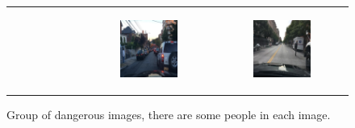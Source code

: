 \begin{figure}
\begin{tabular}{p{\horspace} p{\horspace} p{\horspace}}
\begin{subfigure}[b]{\subfigwidth}
    \end{subfigure}
    \hfill &
    \begin{subfigure}[b]{\subfigwidth}
        \includegraphics[width=\subfigwidth]{images/gpt4/d5.jpg}
    \end{subfigure} 
    \hfill &
    \begin{subfigure}[b]{\subfigwidth}
        \includegraphics[width=\subfigwidth]{images/gpt4/d6.jpg}
    \end{subfigure}
\end{tabular}
\caption{Group of dangerous images, there are some people in each image.}
\label{fig:dangerous_group}
\end{figure}
